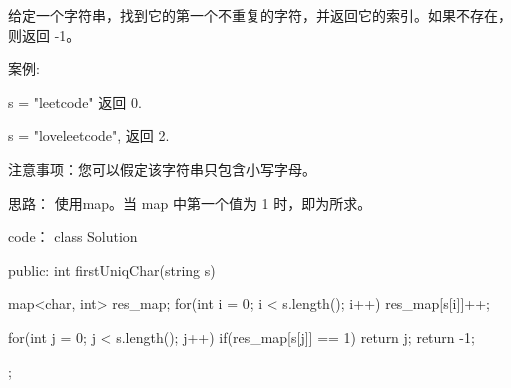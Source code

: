 给定一个字符串，找到它的第一个不重复的字符，并返回它的索引。如果不存在，则返回 -1。

案例:

s = "leetcode"
返回 0.

s = "loveleetcode",
返回 2.
 

注意事项：您可以假定该字符串只包含小写字母。



















思路：
使用map。当 map 中第一个值为 1 时，即为所求。























code：
class Solution {
public:
    int firstUniqChar(string s) {
        map<char, int> res_map;
        for(int i = 0; i < s.length(); i++)
        {
            res_map[s[i]]++;
        }

        for(int j = 0; j < s.length(); j++)
        {
            if(res_map[s[j]] == 1)
                return j;
        }
        return -1;
    }
};